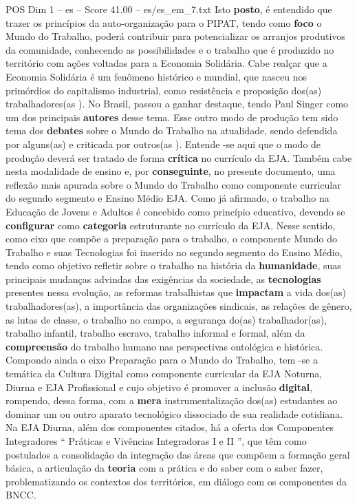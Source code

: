 \begin{textsample}{POS Dim 1 – es – Score 41.00 – es/es\_em\_7.txt}
Isto \textbf{posto}, é entendido que trazer os princípios da auto-organização para o PIPAT, tendo como \textbf{foco} o Mundo do Trabalho, poderá contribuir para potencializar os arranjos produtivos da comunidade, conhecendo as possibilidades e o trabalho que é produzido no território com ações voltadas para a Economia Solidária.
Cabe realçar que a Economia Solidária é um fenômeno histórico e mundial, que nasceu nos primórdios do capitalismo industrial, como resistência e proposição dos(as) trabalhadores(as ).
No Brasil, passou a ganhar destaque, tendo Paul Singer como um dos principais \textbf{autores} desse tema.
Esse outro modo de produção tem sido tema dos \textbf{debates} sobre o Mundo do Trabalho na atualidade, sendo defendida por alguns(as) e criticada por outros(as ).
Entende -se aqui que o modo de produção deverá ser tratado de forma \textbf{crítica} no currículo da EJA.
Também cabe nesta modalidade de ensino e, por \textbf{conseguinte}, no presente documento, uma reflexão mais apurada sobre o Mundo do Trabalho como componente curricular do segundo segmento e Ensino Médio EJA.
Como já afirmado, o trabalho na Educação de Jovens e Adultos é concebido como princípio educativo, devendo se \textbf{configurar} como \textbf{categoria} estruturante no currículo da EJA.
Nesse sentido, como eixo que compõe a preparação para o trabalho, o componente Mundo do Trabalho e suas Tecnologias foi inserido no segundo segmento do Ensino Médio, tendo como objetivo refletir sobre o trabalho na história da \textbf{humanidade}, suas principais mudanças advindas das exigências da sociedade, as \textbf{tecnologias} presentes nessa evolução, as reformas trabalhistas que \textbf{impactam} a vida dos(as) trabalhadores(as), a importância das organizações sindicais, as relações de gênero, as lutas de classe, o trabalho no campo, a segurança do(as) trabalhador(as), trabalho infantil, trabalho escravo, trabalho informal e formal, além da \textbf{compreensão} do trabalho humano nas perspectivas ontológica e histórica.
Compondo ainda o eixo Preparação para o Mundo do Trabalho, tem -se a temática da Cultura Digital como componente curricular da EJA Noturna, Diurna e EJA Profissional e cujo objetivo é promover a inclusão \textbf{digital}, rompendo, dessa forma, com a \textbf{mera} instrumentalização dos(as) estudantes ao dominar um ou outro aparato tecnológico dissociado de sua realidade cotidiana.
Na EJA Diurna, além dos componentes citados, há a oferta dos Componentes Integradores “ Práticas e Vivências Integradoras I e II ”, que têm como postulados a consolidação da integração das áreas que compõem a formação geral básica, a articulação da \textbf{teoria} com a prática e do saber com o saber fazer, problematizando os contextos dos territórios, em diálogo com os componentes da BNCC.

\end{textsample}
